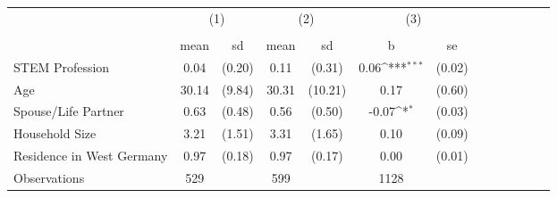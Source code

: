 {
\def\sym#1{\ifmmode^{#1}\else\(^{#1}\)\fi}
\begin{tabular}{l*{3}{cccc}}
\toprule
                    &\multicolumn{2}{c}{(1)}  &\multicolumn{2}{c}{(2)}  &\multicolumn{2}{c}{(3)}           \\
                    &\multicolumn{2}{c}{}     &\multicolumn{2}{c}{}     &\multicolumn{2}{c}{}              \\
                    &        mean&          sd&        mean&          sd&           b         &          se\\
\midrule
STEM Profession     &        0.04&      (0.20)&        0.11&      (0.31)&        0.06\sym{***}&      (0.02)\\
Age                 &       30.14&      (9.84)&       30.31&     (10.21)&        0.17         &      (0.60)\\
Spouse/Life Partner &        0.63&      (0.48)&        0.56&      (0.50)&       -0.07\sym{*}  &      (0.03)\\
Household Size      &        3.21&      (1.51)&        3.31&      (1.65)&        0.10         &      (0.09)\\
Residence in West Germany&        0.97&      (0.18)&        0.97&      (0.17)&        0.00         &      (0.01)\\
\midrule
Observations        &         529&            &         599&            &        1128         &            \\
\bottomrule
\end{tabular}
}
